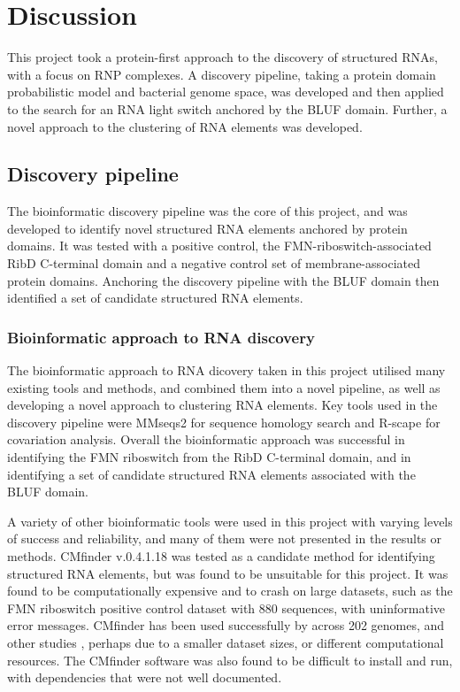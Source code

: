 \chapter{Discussion}

This project took a protein-first approach to the discovery of structured RNAs, with a focus on \ac{RNP} complexes.
A discovery pipeline, taking a protein domain probabilistic model and bacterial genome space, was developed and then applied to the search for an RNA light switch anchored by the \ac{BLUF} domain.
Further, a novel approach to the clustering of RNA elements was developed.

\section{Discovery pipeline}

The bioinformatic discovery pipeline was the core of this project, and was developed to identify novel structured RNA elements anchored by protein domains.
It was tested with a positive control, the \ac{FMN}-riboswitch-associated RibD C-terminal domain and a negative control set of membrane-associated protein domains.
Anchoring the discovery pipeline with the \ac{BLUF} domain then identified a set of candidate structured RNA elements.

\subsection{Bioinformatic approach to RNA discovery}

The bioinformatic approach to RNA dicovery taken in this project utilised many existing tools and methods, and combined them into a novel pipeline, as well as developing a novel approach to clustering RNA elements.
Key tools used in the discovery pipeline were MMseqs2 \citep{Kallenborn2025} for sequence homology search and R-scape \citep{Rivas2017} for covariation analysis.
Overall the bioinformatic approach was successful in identifying the \ac{FMN} riboswitch from the RibD C-terminal domain, and in identifying a set of candidate structured RNA elements associated with the \ac{BLUF} domain.

A variety of other bioinformatic tools were used in this project with varying levels of success and reliability, and many of them were not presented in the results or methods.
CMfinder v.0.4.1.18 \citep{Yao2006} was tested as a candidate method for identifying structured RNA elements, but was found to be unsuitable for this project.
It was found to be computationally expensive and to crash on large datasets, such as the \ac{FMN} riboswitch positive control dataset with 880 sequences, with uninformative error messages.
CMfinder has been used successfully by \citet{Geissler2026} across 202 genomes, and other studies \citep{Roth2014, Sack2025, Weinberg2015}, perhaps due to a smaller dataset sizes, or different computational resources.
The CMfinder software was also found to be difficult to install and run, with dependencies that were not well documented.

